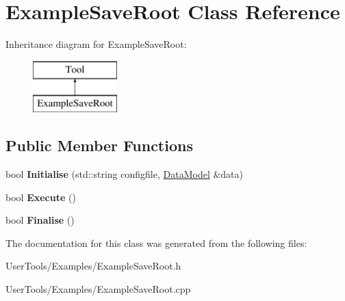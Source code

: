 \hypertarget{classExampleSaveRoot}{\section{Example\-Save\-Root Class Reference}
\label{classExampleSaveRoot}
}
Inheritance diagram for Example\-Save\-Root\-:\begin{figure}[H]
\begin{center}
\leavevmode
\includegraphics[height=2.000000cm]{classExampleSaveRoot}
\end{center}
\end{figure}
\subsection*{Public Member Functions}
\begin{DoxyCompactItemize}
\item 
\hypertarget{classExampleSaveRoot_a71c138625e281936faa6febe787a4f24}{bool {\bfseries Initialise} (std\-::string configfile, \hyperlink{classDataModel}{Data\-Model} \&data)}\label{classExampleSaveRoot_a71c138625e281936faa6febe787a4f24}

\item 
\hypertarget{classExampleSaveRoot_a5068a1d780f454298301ee6f26ac4357}{bool {\bfseries Execute} ()}\label{classExampleSaveRoot_a5068a1d780f454298301ee6f26ac4357}

\item 
\hypertarget{classExampleSaveRoot_a06f29407ff26756770b6e60eedae8ebf}{bool {\bfseries Finalise} ()}\label{classExampleSaveRoot_a06f29407ff26756770b6e60eedae8ebf}

\end{DoxyCompactItemize}


The documentation for this class was generated from the following files\-:\begin{DoxyCompactItemize}
\item 
User\-Tools/\-Examples/Example\-Save\-Root.\-h\item 
User\-Tools/\-Examples/Example\-Save\-Root.\-cpp\end{DoxyCompactItemize}
